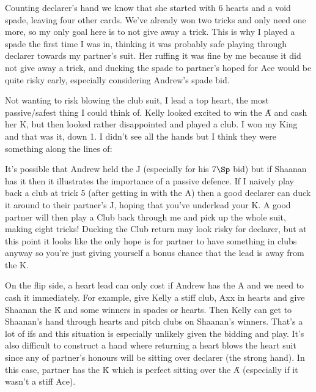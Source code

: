 \documentclass[a4paper]{JoshCards}
\begin{document}
Counting declarer's hand we know that she started with 6 hearts and a void spade, leaving four other cards. We've already won two tricks and only need one more, so my only goal here is to not give away a trick. This is why I played a spade the first time I was in, thinking it was probably safe playing through declarer towards my partner's suit. Her ruffing it was fine by me because it did not give away a trick, and ducking the spade to partner's hoped for Ace would be quite risky early, especially considering Andrew's spade bid. 

Not wanting to risk blowing the club suit, I lead a top heart, the most passive/safest thing I could think of. Kelly looked excited to win the \H A and cash her \C K, but then looked rather disappointed and played a club. I won my King and that was it, down 1. I didn't see all the hands but I think they were something along the lines of:

\gamefont{\larger}
\leftupper{}%
{}{}
\rightupper{\contract:
8\Di}{\declarer: \west}{}
\rightlower{}{}{}
\showAll*

It's possible that Andrew held the \C J (especially for his $7 \Sp$ bid) but if Shaanan has it then it illustrates the importance of a passive defence. If I naively play back a club at trick 5 (after getting in with the \D A) then a good declarer can duck it around to their partner's \C J, hoping that you've underlead your \C K. A good partner will then play a Club back through me and pick up the whole suit, making eight tricks! Ducking the Club return may look risky for declarer, but at this point it looks like the only hope is for partner to have something in clubs anyway so you're just giving yourself a bonus chance that the lead is away from the \C K. 

On the flip side, a heart lead can only cost if Andrew has the \C A and we need to cash it immediately. For example, give Kelly a stiff club, Axx in hearts and give Shaanan the \H K and some winners in spades or hearts. Then Kelly can get to Shaanan's hand through hearts and pitch clubs on Shaanan's winners. That's a lot of ifs and this situation is especially unlikely given the bidding and play. It's also difficult to construct a hand where returning a heart blows the heart suit since any of partner's honours will be sitting over declarer (the strong hand). In this case, partner has the \H K which is perfect sitting over the \H A (especially if it wasn't a stiff Ace).
\end{document}
